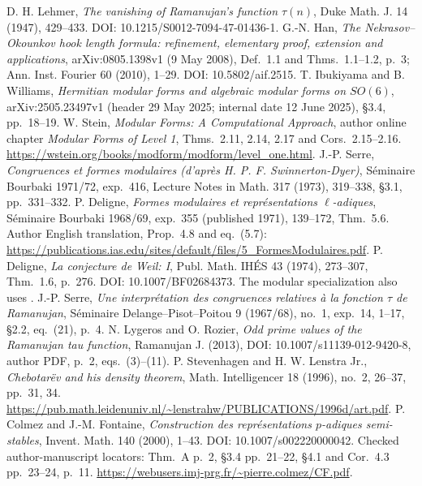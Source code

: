  D. H. Lehmer, \emph{The vanishing of Ramanujan's function $\tau(n)$}, Duke Math. J. 14 (1947), 429--433. DOI: 10.1215/S0012-7094-47-01436-1.
 G.-N. Han, \emph{The Nekrasov--Okounkov hook length formula: refinement, elementary proof, extension and applications}, arXiv:0805.1398v1 (9 May 2008), Def.~1.1 and Thms.~1.1--1.2, p.~3; Ann. Inst. Fourier 60 (2010), 1--29. DOI: 10.5802/aif.2515.
 T. Ibukiyama and B. Williams, \emph{Hermitian modular forms and algebraic modular forms on $SO(6)$}, arXiv:2505.23497v1 (header 29 May 2025; internal date 12 June 2025), \S3.4, pp.~18--19.
 W. Stein, \emph{Modular Forms: A Computational Approach}, author online chapter \emph{Modular Forms of Level 1}, Thms.~2.11, 2.14, 2.17 and Cors.~2.15--2.16. \url{https://wstein.org/books/modform/modform/level_one.html}.
 J.-P. Serre, \emph{Congruences et formes modulaires (d'apr\`es H. P. F. Swinnerton-Dyer)}, S\'eminaire Bourbaki 1971/72, exp.~416, Lecture Notes in Math. 317 (1973), 319--338, \S3.1, pp.~331--332.
 P. Deligne, \emph{Formes modulaires et repr\'esentations $\ell$-adiques}, S\'eminaire Bourbaki 1968/69, exp.~355 (published 1971), 139--172, Thm.~5.6. Author English translation, Prop.~4.8 and eq.~(5.7): \url{https://publications.ias.edu/sites/default/files/5_FormesModulaires.pdf}.
 P. Deligne, \emph{La conjecture de Weil: I}, Publ. Math. IH\'ES 43 (1974), 273--307, Thm.~1.6, p.~276. DOI: 10.1007/BF02684373. The modular specialization also uses \cite{DeligneModular}.
 J.-P. Serre, \emph{Une interpr\'etation des congruences relatives \`a la fonction $\tau$ de Ramanujan}, S\'eminaire Delange--Pisot--Poitou 9 (1967/68), no.~1, exp.~14, 1--17, \S2.2, eq.~(21), p.~4.
 N. Lygeros and O. Rozier, \emph{Odd prime values of the Ramanujan tau function}, Ramanujan J. (2013), DOI: 10.1007/s11139-012-9420-8, author PDF, p.~2, eqs.~(3)--(11).
 P. Stevenhagen and H. W. Lenstra Jr., \emph{Chebotar\"ev and his density theorem}, Math. Intelligencer 18 (1996), no.~2, 26--37, pp.~31, 34. \url{https://pub.math.leidenuniv.nl/~lenstrahw/PUBLICATIONS/1996d/art.pdf}.
 P. Colmez and J.-M. Fontaine, \emph{Construction des repr\'esentations $p$-adiques semi-stables}, Invent. Math. 140 (2000), 1--43. DOI: 10.1007/s002220000042. Checked author-manuscript locators: Thm.~A p.~2, \S3.4 pp.~21--22, \S4.1 and Cor.~4.3 pp.~23--24, p.~11. \url{https://webusers.imj-prg.fr/~pierre.colmez/CF.pdf}.
